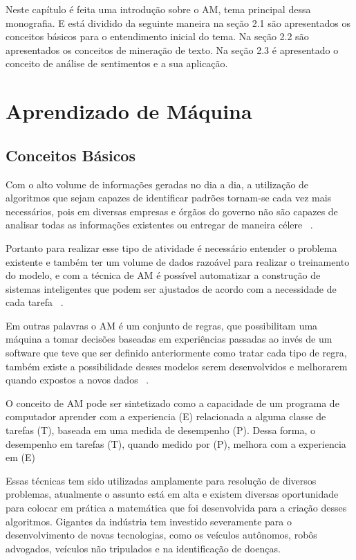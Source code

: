Neste capítulo é feita uma introdução sobre o \acrshort{AM}, tema principal dessa monografia. E está dividido da seguinte
maneira na seção 2.1 são apresentados os conceitos básicos para o entendimento inicial do tema. Na seção 2.2 são apresentados
os conceitos de mineração de texto. Na seção 2.3 é apresentado o conceito de análise de sentimentos e a sua aplicação.


\section{Aprendizado de Máquina}
  \subsection{Conceitos Básicos}

    Com o alto volume de informações geradas no dia a dia, a utilização de algoritmos que sejam capazes de identificar padrões tornam-se cada
    vez mais necessários, pois em diversas empresas e órgãos do governo não são capazes de analisar todas as informações existentes ou entregar
    de maneira célere ~\cite{nasrabadi2007pattern}. 
    
    Portanto para realizar esse tipo de atividade é necessário entender o problema existente e também ter um volume de dados razoável para realizar o treinamento do modelo, e com a técnica de \acrshort{AM} é possível automatizar a construção
    de sistemas inteligentes que podem ser ajustados de acordo com a necessidade de cada tarefa ~\cite{bonaccorso2017machine}.

    Em outras palavras o \acrshort{AM} é um conjunto de regras, que possibilitam uma máquina a tomar decisões baseadas em experiências passadas ao invés
    de um software que teve que ser definido anteriormente como tratar cada tipo de regra, também existe a possibilidade desses modelos serem desenvolvidos
    e melhorarem quando expostos a novos dados ~\cite{zurada1995review}.


    O conceito de \acrshort{AM} pode ser sintetizado como a capacidade de um programa de computador aprender com a experiencia (E) relacionada a alguma 
    classe de tarefas (T), baseada em uma medida de desempenho (P). Dessa forma, o desempenho em tarefas (T), quando medido por (P), melhora com a 
    experiencia em (E) ~\cite{mitchell}

    Essas técnicas tem sido utilizadas amplamente para resolução de diversos problemas, atualmente o assunto está em alta e existem diversas oportunidade
    para colocar em prática a matemática que foi desenvolvida para a criação desses algoritmos. Gigantes da indústria tem investido severamente para
    o desenvolvimento de novas tecnologias, como os veículos autônomos, robôs advogados, veículos não tripulados e na identificação de doenças.


